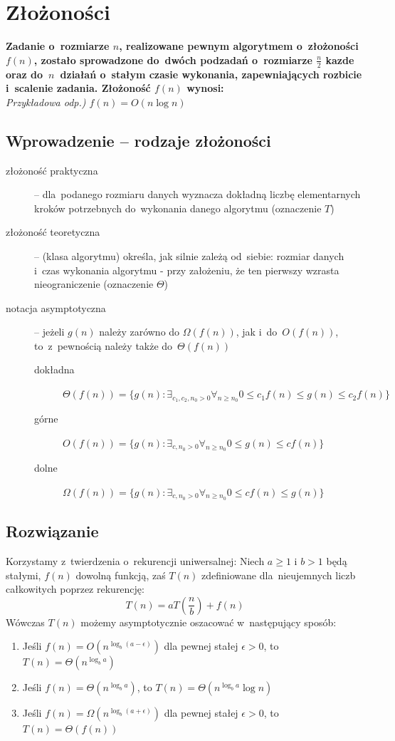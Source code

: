 \section{Złożoności}

\textbf{Zadanie o~rozmiarze $n$, realizowane pewnym algorytmem o~złożoności $f(n)$, zostało sprowadzone do~dwóch podzadań o~rozmiarze $\frac{n}{2}$ kazde oraz do~$n$~działań o~stałym czasie wykonania, zapewniających rozbicie i~scalenie zadania. Złożoność $f(n)$ wynosi:}\\
\textit{Przykładowa odp.) $f(n) = O(n\log{n})$}

\vspace{0.4cm}
\subsection{Wprowadzenie -- rodzaje złożoności}
\begin{description}
	\item[złożoność praktyczna] -- dla~podanego rozmiaru danych wyznacza dokładną liczbę elementarnych kroków potrzebnych do~wykonania danego algorytmu (oznaczenie \textbf{$T$})
	\item[złożoność teoretyczna] -- (klasa algorytmu) określa, jak silnie zależą od~siebie: rozmiar danych i~czas wykonania algorytmu - przy założeniu, że ten pierwszy wzrasta nieograniczenie (oznaczenie \textbf{$\Theta$})
	\item[notacja asymptotyczna] -- jeżeli $g(n)$ należy zarówno do $\Omega(f(n))$, jak i~do~$O(f(n))$, to~z~pewnością należy także do~$\Theta(f(n))$ 
	\begin{description}
		\item[dokładna] $ \Theta (f(n)) = \{ g(n): \exists_{c_1, c_2,n_0 > 0} \forall_{n \ge n_0} 0 \le c_1 f(n) \le g(n) \le c_2 f(n)  \} $
		\item[górne] $ O(f(n)) = \{ g(n): \exists_{c,n_0 > 0} \forall_{n \ge n_0} 0 \le g(n) \le c f(n)  \} $
		\item[dolne]$ \Omega (f(n)) = \{ g(n): \exists_{c,n_0 > 0} \forall_{n \ge n_0} 0 \le  c f(n) \le g(n) \} $
	\end{description}
\end{description}
\subsection{Rozwiązanie}
Korzystamy z~twierdzenia o~rekurencji uniwersalnej:
Niech $a \ge 1$ i $b > 1$ będą stałymi, $f(n)$ dowolną funkcją, zaś $T(n)$ zdefiniowane dla~nieujemnych liczb całkowitych poprzez rekurencję:
$$T(n) = aT(\frac{n}{b}) + f(n)$$
Wówczas $T(n)$ możemy asymptotycznie oszacować w~następujący sposób:
\begin{enumerate}
	\item Jeśli $f(n) = O(n^{\log_b {(a -\epsilon)}})$ dla pewnej stałej $\epsilon > 0$, to $T(n) = \Theta(n^{\log_b a})$
	\item Jeśli $f(n) = \Theta(n^{\log_b {a}})$, to $T(n) = \Theta(n^{\log_b a} \log n)$
	\item Jeśli $f(n) = \Omega(n^{\log_b {(a + \epsilon)}})$ dla pewnej stałej $\epsilon > 0$, to $T(n) = \Theta(f(n))$
\end{enumerate}

